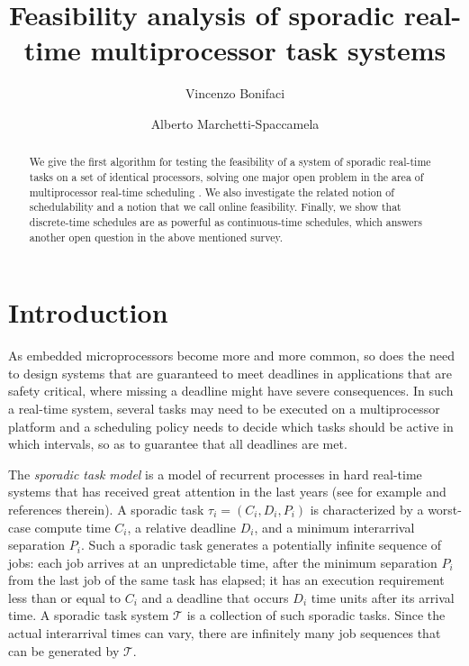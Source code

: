 \documentclass{llncs}
\title{Feasibility analysis of sporadic real-time multiprocessor task systems}
\author{Vincenzo Bonifaci\inst{1} \and Alberto Marchetti-Spaccamela\inst{2}}
\institute{Max-Planck Institut f\"ur Informatik, Saarbr\"ucken, Germany \\
\email{bonifaci@mpi-inf.mpg.de}
\and
Sapienza Universit\`a di Roma, Rome, Italy \\
\email{alberto@dis.uniroma1.it}}
\newcommand{\tsys}{\ensuremath{\mathcal{T}}}
\begin{document}
\maketitle
\begin{abstract}
We give the first algorithm for testing the feasibility of a system of sporadic real-time tasks on a set of identical processors, solving one major open problem in the area of multiprocessor real-time scheduling \cite{Baruah:2009:open}. We also investigate the related notion of schedulability and a notion that we call online feasibility. Finally, we show that discrete-time schedules are as powerful as continuous-time schedules, which answers another open question in the above mentioned survey. 
\end{abstract}


\section{Introduction}


As embedded microprocessors become more and more common, so does the need to design systems that are guaranteed to meet deadlines in applications that are safety critical, where missing a deadline might have severe consequences. In such a real-time system, several tasks may need to be executed on a multiprocessor platform and a scheduling policy needs to decide which tasks should be active in which intervals, so as to guarantee that all deadlines are met. 

The \emph{sporadic task model} is a model of recurrent processes in hard real-time systems that has received great attention in the last years (see for example \cite{Baker:2007,Baruah:2009:open} and references therein). A sporadic task $\tau_i = (C_i, D_i, P_i)$ is characterized by a worst-case compute time $C_i$, a relative deadline $D_i$, and a minimum interarrival separation $P_i$. Such a sporadic task generates a potentially infinite sequence of jobs: each job arrives at an unpredictable time, after the minimum separation $P_i$ from the last job of the same task has elapsed; it has an execution requirement less than or equal to $C_i$ and a deadline that occurs $D_i$ time units after its arrival time. 
A sporadic task system $\tsys$ is a collection of such sporadic tasks. Since the actual interarrival times can vary, there are infinitely many job sequences that can be generated by $\tsys$. 
\end{document}
